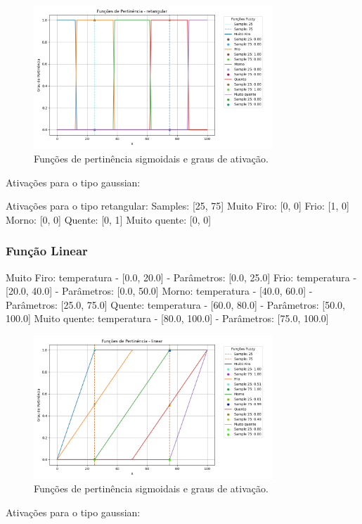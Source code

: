\documentclass[a4paper,12pt]{article}
\begin{document}
\begin{figure}[H]
    \centering
    \includegraphics[width=0.8\textwidth]{img/funções_de_pertinência_retangular_fuzzificado.png}
    \caption{Funções de pertinência sigmoidais e graus de ativação.}
\end{figure}
Ativações para o tipo gaussian:

Ativações para o tipo retangular:
Samples: [25, 75]
Muito Firo: [0, 0]
Frio: [1, 0]
Morno: [0, 0]
Quente: [0, 1]
Muito quente: [0, 0]

\subsubsection{Função Linear}

Muito Firo: temperatura - [0.0, 20.0] - Parâmetros: [0.0, 25.0]
Frio: temperatura - [20.0, 40.0] - Parâmetros: [0.0, 50.0]
Morno: temperatura - [40.0, 60.0] - Parâmetros: [25.0, 75.0]
Quente: temperatura - [60.0, 80.0] - Parâmetros: [50.0, 100.0]
Muito quente: temperatura - [80.0, 100.0] - Parâmetros: [75.0, 100.0]

\begin{figure}[H]
    \centering
    \includegraphics[width=0.8\textwidth]{img/funções_de_pertinência_linear_fuzzificado.png}
    \caption{Funções de pertinência sigmoidais e graus de ativação.}
\end{figure}
Ativações para o tipo gaussian:
\end{document}
